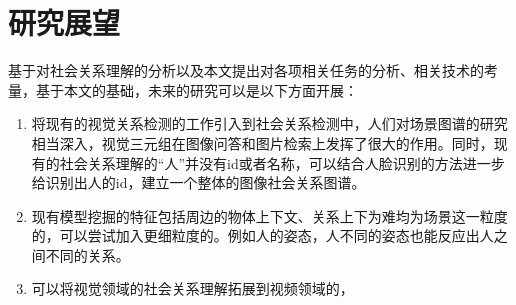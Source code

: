 \section{研究展望}

基于对社会关系理解的分析以及本文提出对各项相关任务的分析、相关技术的考量，基于本文的基础，未来的研究可以是以下方面开展：
\begin{enumerate}
    \item 将现有的视觉关系检测的工作引入到社会关系检测中，人们对场景图谱的研究相当深入，视觉三元组在图像问答和图片检索上发挥了很大的作用。同时，现有的社会关系理解的``人''并没有id或者名称，可以结合人脸识别的方法进一步给识别出人的id，建立一个整体的图像社会关系图谱。
    \item 现有模型挖掘的特征包括周边的物体上下文、关系上下为难均为场景这一粒度的，可以尝试加入更细粒度的。例如人的姿态，人不同的姿态也能反应出人之间不同的关系。
    \item 可以将视觉领域的社会关系理解拓展到视频领域的，
\end{enumerate}

